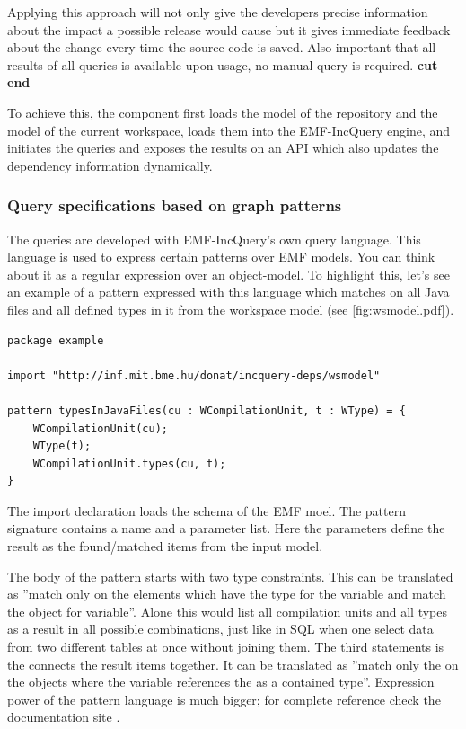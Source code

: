 Applying this approach will not only give the developers precise information
about the impact a possible release would cause but it gives immediate feedback
about the change every time the source code is saved. Also important that
all results of all queries is available upon usage, no manual query is required.
\textbf{cut end}

To achieve this, the component first loads the model of the repository and the 
model of the current workspace, loads them into the EMF-IncQuery engine, 
and initiates the queries and exposes the results on an API which also updates
the dependency information dynamically.
 
\subsubsection{Query specifications based on graph patterns}
The queries are developed with EMF-IncQuery's own query language. This language
is used to express certain patterns over EMF models. You can think about it as 
a regular expression over an object-model. To highlight this, let's see an example
of a pattern expressed with this language which matches on all Java files and
all defined types in it from the workspace model (see \autoref{fig:wsmodel.pdf}). 
\begin{lstlisting}
package example

import "http://inf.mit.bme.hu/donat/incquery-deps/wsmodel"

pattern typesInJavaFiles(cu : WCompilationUnit, t : WType) = {
	WCompilationUnit(cu);
	WType(t);
	WCompilationUnit.types(cu, t);
}
\end{lstlisting}

The import declaration loads the schema of the EMF moel. The pattern signature
contains a name and a parameter list. Here the parameters define the result as
the found/matched items from the input model. 

The body of the pattern starts with two type constraints. This can be translated
as ''match only on the elements which have the  type for
the  variable and match the  object for 
variable''. Alone this would list all compilation units and all types as a
result in all possible combinations, just like in SQL when one select data from
two different tables at once without joining them. The third statements is the
connects the result items together. It can be translated as ''match only the on
the objects  where the  variable references the  as a contained
type''. Expression power of the pattern language is much bigger; for complete
reference check the documentation site \cite{EMFIncQuery}.

